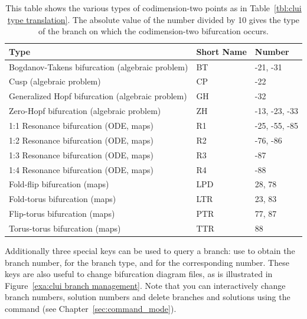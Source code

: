 \documentclass[12pt]{report}
\begin{document}
 \begin{table}[htbp]
 \begin{center}
 \begin{tabular}{| l | l | l |}
 \hline
 Type & Short Name & Number \\
\hline
 Bogdanov-Takens bifurcation (algebraic problem) & BT & -21, -31 \\
 \hline
 Cusp (algebraic problem) & CP & -22 \\
\hline
 Generalized Hopf bifurcation (algebraic problem) & GH & -32 \\
\hline
 Zero-Hopf bifurcation (algebraic problem) & ZH & -13, -23, -33 \\
\hline
 1:1 Resonance bifurcation (ODE, maps) & R1 & -25, -55, -85 \\
\hline
 1:2 Resonance bifurcation (ODE, maps) & R2 & -76, -86 \\
\hline
 1:3 Resonance bifurcation (ODE, maps) & R3 & -87 \\
\hline
 1:4 Resonance bifurcation (ODE, maps) & R4 & -88 \\
\hline
 Fold-flip bifurcation (maps) & LPD & 28, 78 \\
\hline
 Fold-torus bifurcation (maps) & LTR & 23, 83 \\
\hline
 Flip-torus bifurcation (maps) & PTR & 77, 87 \\
\hline
 Torus-torus bifurcation (maps) & TTR & 88 \\
\hline
 \end{tabular}
 \caption[Codimension-two type translations.]
 {This table shows the various types of codimension-two points
 as in Table~\ref{tbl:clui type translation}. The absolute value
 of the number divided by 10 gives the type of the branch on which
 the codimension-two bifurcation occurs.}
 \label{tbl:clui codim2 type translation}
 \end{center}
 \end{table}

 Additionally three special keys can be used to query a branch: use
  to obtain the branch number, 
 for the branch type, and  for the
 corresponding number. These keys are also useful to change
 bifurcation diagram files, as is illustrated in
 Figure~\ref{exa:clui branch management}. Note that you can
 interactively change branch numbers, solution numbers and delete
 branches and solutions using the  command
 (see Chapter~\ref{sec:command_mode}).
\end{document}
